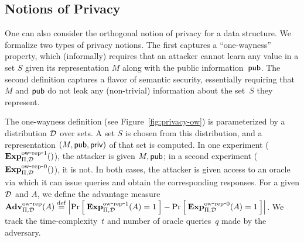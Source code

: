 \subsection{Notions of Privacy}
One can also consider the orthogonal notion of privacy for a
data structure. 
We formalize two types of privacy notions. The first captures
a ``one-wayness'' property, which (informally) requires that an attacker
cannot learn any value in a set $S$ given its
representation $M$ along with the public information~${\sf pub}$.  The second definition
captures a flavor of semantic security, essentially requiring that $M$ and ${\sf pub}$ do
not leak any (non-trivial) information about the set~$S$ they represent.

The one-wayness definition (see
Figure~\ref{fig:privacy-ow}) is parameterized by a distribution $\mathcal{D}_{}^{}$ over
sets. 
A set $S$ is chosen from this distribution, and a representation
$(M,{\sf pub},{\sf priv})$ of that set is computed.
In one experiment ($\ExpPriv{\Pi,\distr{}{}}$), the attacker is given $M, {\sf pub}$;
in a second experiment ($\mathrm{\mathbf{Exp}}^{\mathrm{ow\mbox{-}rep\mbox{-}0}}_{\Pi,\mathcal{D}_{}^{}}()$), it is not.
In both cases, the attacker is given
access to an oracle via which it can
issue queries and obtain the corresponding responses.
For a given $\mathcal{D}_{}^{}$ and $A$, we define the advantage measure
$\mathrm{\mathbf{Adv}}^{\mathrm{ow\mbox{-}rep}}_{\Pi,\mathcal{D}_{}^{}}(A) \stackrel{\rm def}{=}
\left| \Pr\left[\: \mathrm{\mathbf{Exp}}^{\mathrm{ow\mbox{-}rep\mbox{-}1}}_{\Pi,\mathcal{D}_{}^{}}(A)=1 \:\right] - \Pr\left[\: \mathrm{\mathbf{Exp}}^{\mathrm{ow\mbox{-}rep\mbox{-}0}}_{\Pi,\mathcal{D}_{}^{}}(A)=1 \:\right] \right|$.
We track the
time-complexity~$t$ and number of oracle queries~$q$ made by the adversary.


